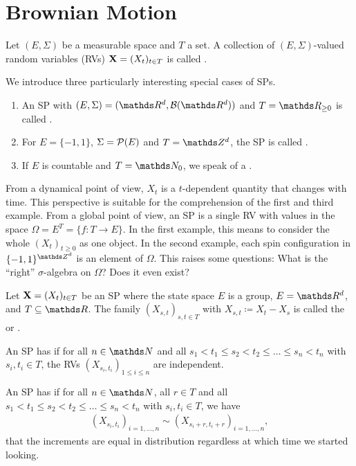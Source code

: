 \chapter{Brownian Motion}
\begin{defi}
Let $(E, \Sigma)$ be a measurable space and $T$ a set.
A collection of $(E, \Sigma)$-valued random variables (RVs)
$\mathbf{X} = (X_t)_{t\in T}$ is called .
\end{defi}

\begin{bsp}
We introduce three particularly interesting special cases of SPs.
\begin{enumerate}[label=(\alph*)]
\item An SP  with $(E, \Sigma) = (\Rd, \Borel(\Rd))$
	and $T=\R_{\geq 0}$
	is called .
\item For $E = \{-1,1\}$, \(\Sigma = \mathcal{P}(E)\) and $T=\Z^d$,
	the SP is called .
\item If $E$ is countable and $T=\N_0$, we speak of a .
\qedhere
\end{enumerate}
\end{bsp}

From a dynamical point of view,
$X_t$ is a $t$-dependent quantity that changes with time.
This perspective is suitable for the comprehension of the first and third example.
From a global point of view,
an SP is a single RV with values in the space $\Omega=E^T=\{f\colon T\to E\}$.
In the first example,
this means to consider the whole  $(X_t)_{t\geq 0}$ as one object.
In the second example,
each spin configuration in $\{-1,1\}^{\Z^d}$ is an element of $\Omega$.
This raises some questions:
What is the “right” $\sigma$-algebra on \(\Omega\)?
Does it even exist?

\begin{defi}
Let $\mathbf{X} = (X_t)_{t\in T}$ be an SP
where the state space $E$ is a group, \eg $E=\Rd$,
and $T\subseteq \R$.
The family $(X_{s,t})_{s,t\in T}$ with $X_{s,t}\coloneqq X_t-X_s$
is called the  or .

An SP has 
if for all $n\in \N$ and all
$s_1 < t_1 \leq s_2 < t_2 \leq \dots \leq s_n < t_n$
with $s_i, t_i \in T$,
the RVs $(X_{s_i,t_i})_{1\leq i \leq n}$ are independent.

An SP has 
if for all $n\in \N$, all \(r \in T\) and all
$s_1 < t_1 \leq s_2 < t_2 \leq \dots \leq s_n < t_n$
with $s_i,t_i \in T$,
we have
\begin{align*}
(X_{s_i,t_i})_{i=1,\dots,n}\sim  (X_{s_i+r,t_i+r})_{i=1,\dots,n},
\end{align*}
\ie that the increments are equal in distribution
regardless at which time we started looking.
\end{defi}

